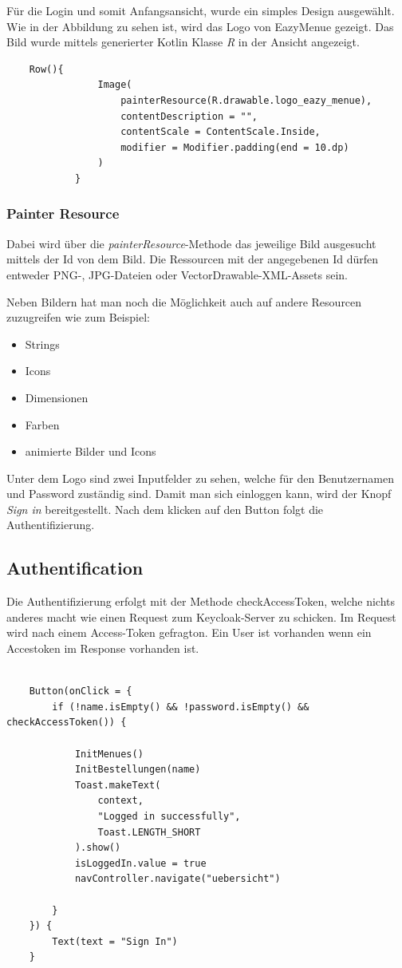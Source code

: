 Für die Login und somit Anfangsansicht, wurde ein simples Design ausgewählt. Wie in der Abbildung zu sehen ist, wird das Logo von
EazyMenue gezeigt. Das Bild wurde mittels generierter Kotlin Klasse \textit{R} in der Ansicht angezeigt.
\begin{lstlisting}
    Row(){
                Image(
                    painterResource(R.drawable.logo_eazy_menue),
                    contentDescription = "",
                    contentScale = ContentScale.Inside,
                    modifier = Modifier.padding(end = 10.dp)
                )
            }
\end{lstlisting}

\subsubsection{Painter Resource}
\cite{Painter-Resource}
Dabei wird über die \textit{painterResource}-Methode das jeweilige Bild ausgesucht mittels der Id von dem Bild.
Die Ressourcen mit der angegebenen Id dürfen entweder PNG-, JPG-Dateien oder VectorDrawable-XML-Assets sein. 

Neben Bildern hat man noch die Möglichkeit auch auf andere Resourcen zuzugreifen wie zum Beispiel:
\begin{itemize}
    \item Strings
    \item Icons
    \item Dimensionen
    \item Farben
    \item animierte Bilder und Icons
\end{itemize}

Unter dem Logo sind zwei Inputfelder zu sehen, welche für den Benutzernamen und Password zuständig sind.
Damit man sich einloggen kann, wird der Knopf \textit{Sign in} bereitgestellt. Nach dem klicken auf den Button folgt
die Authentifizierung.  



\subsection{Authentification}
Die Authentifizierung erfolgt mit der Methode checkAccessToken, welche nichts anderes macht wie einen Request zum Keycloak-Server zu schicken.
Im Request wird nach einem Access-Token gefragton.
Ein User  ist vorhanden wenn ein Accestoken im Response vorhanden ist.

\begin{lstlisting}

    Button(onClick = {
        if (!name.isEmpty() && !password.isEmpty() && checkAccessToken()) {

            InitMenues()
            InitBestellungen(name)
            Toast.makeText(
                context,
                "Logged in successfully",
                Toast.LENGTH_SHORT
            ).show()
            isLoggedIn.value = true
            navController.navigate("uebersicht")

        }
    }) {
        Text(text = "Sign In")
    }

\end{lstlisting}




